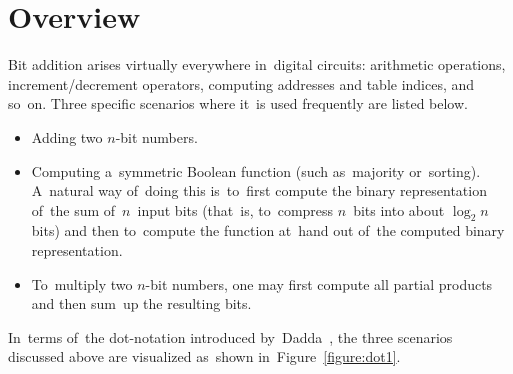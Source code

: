 \documentclass[sigconf, review, anonymous]{acmart}
\begin{document}
\section{Overview}
Bit addition arises virtually everywhere in~digital circuits:
arithmetic operations,
increment/decrement operators,
computing addresses and table indices, and so~on.
Three specific scenarios where it~is used frequently are listed below.
\begin{itemize}
	\item Adding two $n$-bit numbers.
	\item Computing a~symmetric Boolean function
		(such as~majority or~sorting).
		A~natural way of~doing this is~to~first compute
		the binary representation of~the sum of~$n$~input bits
		(that~is, to~compress $n$~bits into about $\log_2 n$ bits)
		and then to~compute the function at~hand
		out of~the computed binary representation.
	\item To~multiply two $n$-bit numbers, one may first compute
		all partial products and then sum~up the resulting bits.
\end{itemize}
In~terms of~the dot-notation introduced by~Dadda~\cite{dadda}, the three scenarios discussed above are visualized as~shown in~Figure~\ref{figure:dot1}.
\end{document}
